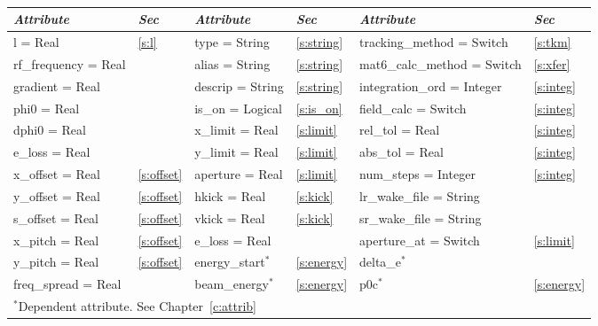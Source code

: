 {{\begin{center}
\tt
\begin{tabular}{|l|l||l|l||l|l|} \hline
  {\sl Attribute} & {\sl Sec}  & {\sl Attribute} & {\sl Sec} & {\sl Attribute} & {\sl Sec} \\ \hline
  l        = Real       & \ref{s:l}      & type = String     & \ref{s:string} & tracking\_method = Switch   & \ref{s:tkm}   \\ \hline
  rf\_frequency = Real  &                & alias = String    & \ref{s:string} & mat6\_calc\_method = Switch & \ref{s:xfer}  \\ \hline
  gradient      = Real  &                & descrip = String  & \ref{s:string} & integration\_ord = Integer  & \ref{s:integ} \\ \hline
  phi0          = Real  &                & is\_on = Logical  & \ref{s:is_on}  & field\_calc = Switch        & \ref{s:integ} \\ \hline
  dphi0         = Real  &                & x\_limit = Real   & \ref{s:limit}  & rel\_tol = Real             & \ref{s:integ} \\ \hline
  e\_loss    = Real     &                & y\_limit = Real   & \ref{s:limit}  & abs\_tol = Real             & \ref{s:integ} \\ \hline
  x\_offset  = Real     & \ref{s:offset} & aperture = Real   & \ref{s:limit}  & num\_steps = Integer        & \ref{s:integ} \\ \hline
  y\_offset  = Real     & \ref{s:offset} & hkick    = Real   & \ref{s:kick}   & lr\_wake\_file = String     &               \\ \hline
  s\_offset  = Real     & \ref{s:offset} & vkick    = Real   & \ref{s:kick}   & sr\_wake\_file = String     &               \\ \hline
  x\_pitch = Real       & \ref{s:offset} & e\_loss  = Real   &                & aperture\_at = Switch       & \ref{s:limit} \\ \hline
  y\_pitch = Real       & \ref{s:offset} & energy\_start$^*$ & \ref{s:energy} & delta\_e$^*$                &               \\ \hline
  freq\_spread = Real   &                & beam\_energy$^*$  & \ref{s:energy} & p0c$^*$                     & \ref{s:energy}\\ \hline
  \multicolumn{6}{l}{\small $^*$Dependent attribute. See Chapter~\ref{c:attrib}} \\
\end{tabular}
\end{center}
\toffset

}}
